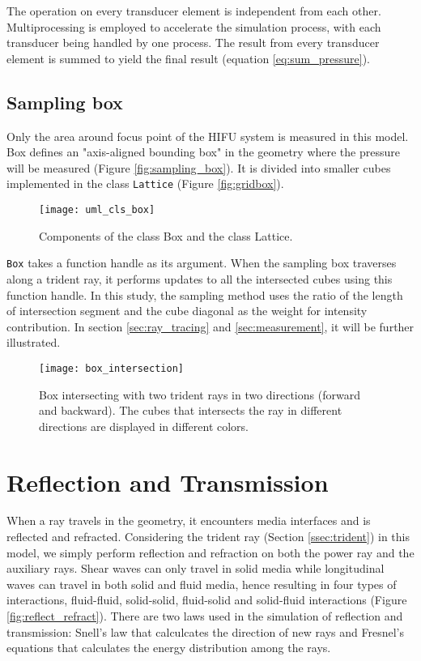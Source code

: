 The operation on every transducer element is independent from each other. Multiprocessing is employed to accelerate the simulation process, with each transducer being handled by one process. The result from every transducer element is summed to yield the final result (equation \ref{eq:sum_pressure}).

\subsection{Sampling box}
Only the area around focus point of the HIFU system is measured in this model. Box defines an "axis-aligned bounding box" in the geometry where the pressure will be measured (Figure \ref{fig:sampling_box}). It is divided into smaller cubes implemented in the class \texttt{Lattice} (Figure \ref{fig:gridbox}).

\begin{figure}[h]
    \centering
    \texttt{[image: uml\_cls\_box]}
    \caption{Components of the class Box and the class Lattice.}
    \label{fig:uml_cls_box}
\end{figure}

\texttt{Box} takes a function handle as its argument. When the sampling box traverses along a trident ray,  it performs updates to all the intersected cubes using this function handle. In this study, the sampling method uses the ratio of the length of intersection segment and the cube diagonal as the weight for intensity contribution. In section \ref{sec:ray_tracing} and \ref{sec:measurement}, it will be further illustrated. 

\begin{figure}[h]
    \centering
    \texttt{[image: box\_intersection]}
    \caption{Box intersecting with two trident rays in two directions (forward and backward). The cubes that intersects the ray in different directions are displayed in different colors.}
    \label{fig:box_intersection}
\end{figure}

\section{Reflection and Transmission} \label{sec:rnr}

When a ray travels in the geometry, it encounters media interfaces and is reflected and refracted. Considering the trident ray (Section \ref{ssec:trident}) in this model, we simply perform reflection and refraction on both the power ray and the auxiliary rays. Shear waves can only travel in solid media while longitudinal waves can travel in both solid and fluid media, hence resulting in four types of interactions, fluid-fluid, solid-solid, fluid-solid and solid-fluid interactions (Figure \ref{fig:reflect_refract}). 
There are two laws used in the simulation of reflection and transmission: Snell's law that calculcates the direction of new rays and Fresnel's equations that calculates the energy distribution among the rays.

